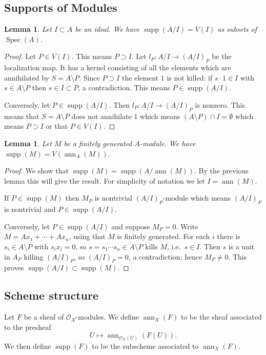 \documentclass[12pt]{article}
\numberwithin{equation}{section}
\newtheorem{lemma}[theorem]{Lemma}
\theoremstyle{definition}
\theoremstyle{remark}
\newcommand{\ann}{\operatorname{ann}}
\newcommand{\Ocal}{\mathcal{O}}
\newcommand{\Spec}{\operatorname{Spec}}
\newcommand{\supp}{\operatorname{supp}}
\begin{document}
\subsection{Supports of Modules}

\begin{lemma}
	Let $I\subset A$ be an ideal. 
	We have $\supp(A/I) = V(I)$ as subsets of $\Spec(A)$.
\end{lemma}
\begin{proof}
	Let $P\in V(I)$. This means $P\supset I$. 
	Let $l_P: A/I \to (A/I)_P$ be the localization map.
	It has a kernel consisting of all the elements which are annihilated by $S = A\setminus P$. 
	Since $P \supset I$ the element $1$ is not killed: if $s\cdot 1 \in I$ with $s\in A\setminus P$ then $s\in I\subset P$, a contradiction. 
	This means $P\in \supp(A/I).$
	
	Conversely, let $P \in \supp(A/I)$. 
	Then $l_P: A/I \to (A/I)_P$ is nonzero. 
	This means that $S=A\setminus P$ does not annihilate 1 which means $(A\setminus P)\cap I = \emptyset$ which means $P \supset I$ or that $P \in V(I)$.
\end{proof}

\begin{lemma}
	Let $M$ be a finitely generated $A$-module. We have $\supp(M) = V(\ann_A(M))$.
\end{lemma}
\begin{proof}
	We show that $\supp(M)=\supp(A/\ann(M))$. 
	By the previous lemma this will give the result. 
	For simplicity of notation we let $I = \ann(M)$. 
	
	If $P\in \supp(M)$ then $M_P$ is nontrivial $(A/I)_P$-module which means $(A/I)_P$ is nontrivial and $P\in \supp(A/I)$. 
	
	Conversely, let $P\in \supp(A/I)$ and suppose $M_P=0$.
	Write $M = Ax_1+\cdots+Ax_n$, using that $M$ is finitely generated.
	For each $i$ there is $s_i\in A\setminus P$ with $s_ix_i=0$, so $s=s_1\cdots s_n\in A\setminus P$ kills $M$, i.e.\ $s\in I$.
	Then $s$ is a unit in $A_P$ killing $(A/I)_P$, so $(A/I)_P=0$, a contradiction; hence $M_P\neq 0$.
	This proves $\supp(A/I)\subset \supp(M)$. 
\end{proof}

\subsection{Scheme structure}
Let $F$ be a sheaf of $\Ocal_X$-modules. 
We define $\ann_X(F)$ to be the sheaf associated to the presheaf 
$$ U\mapsto \ann_{\Ocal_X(U)}(F(U)).$$
We then define $\supp(F)$ to be the subscheme associated to $\ann_X(F)$.
\end{document}
